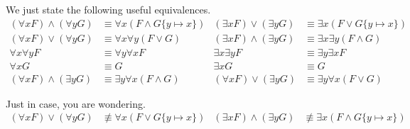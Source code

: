 \begin{lemma}We just state the following useful equivalences.
	\begin{align*}
		(\forall x F) \land (\forall y G) &\equiv \forall x (F\land G\{y\mapsto x\})
		&
		(\exists x F) \lor (\exists y G) &\equiv \exists x (F\lor G\{y\mapsto x\})
		\\
		(\forall x F) \lor (\forall y G) &\equiv \forall x\forall y (F\lor G)
		&
		(\exists x F) \land (\exists y G) &\equiv \exists x\exists y (F\land G)
		\\
		\forall x \forall y F &\equiv \forall y \forall x F
		&
		\exists x \exists y F &\equiv \exists y \exists x F
		\\
		\forall x G &\equiv G & \exists x G &\equiv G
		\\
		(\forall x F) \land (\exists y G) &\equiv \exists y \forall x (F\land G)
		&
		(\forall x F) \lor (\exists y G) &\equiv \exists y \forall x (F\lor G)
	\end{align*}
\end{lemma}

\begin{lemma}Just in case, you are wondering.
	\begin{align*}
	(\forall x F) \lor (\forall y G) &\not\equiv \forall x (F\lor G\{y\mapsto x\})
	&
	(\exists x F) \land (\exists y G) &\not\equiv \exists x (F\land G\{y\mapsto x\})
	\end{align*}
\end{lemma}